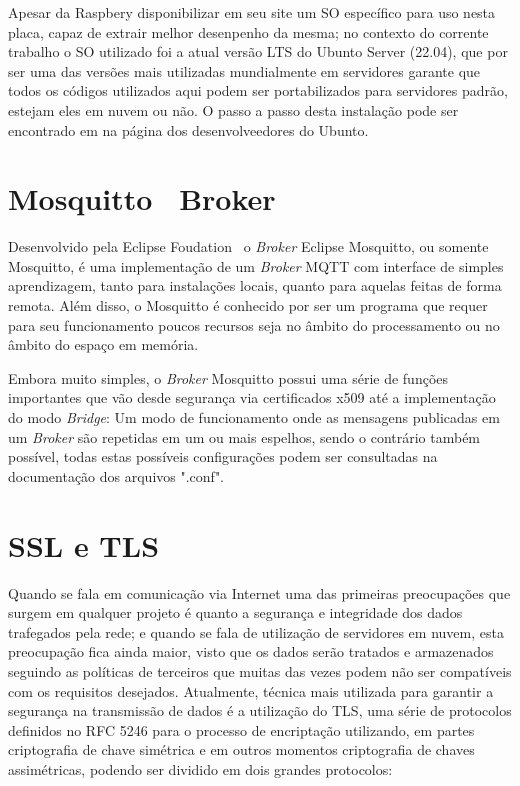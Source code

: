 Apesar da Raspbery disponibilizar em seu site um \ac{SO} específico para uso nesta placa, capaz de extrair melhor 
desenpenho da mesma; no contexto do corrente trabalho o \ac{SO} utilizado foi a atual versão \ac{LTS} do Ubunto Server (22.04),
que por ser uma das versões mais utilizadas mundialmente em servidores garante que todos os códigos utilizados aqui podem 
ser portabilizados para servidores padrão, estejam eles em nuvem ou não. O passo a passo desta instalação pode ser 
encontrado em na página dos desenvolveedores do Ubunto. \cite{ubunto-inst}

\section{Mosquitto\textregistered~ Broker}

Desenvolvido pela Eclipse Foudation\textregistered~ o \textit{Broker} Eclipse Mosquitto, ou somente Mosquitto, é uma 
implementação de um \textit{Broker} \ac{MQTT} com interface de simples aprendizagem, tanto para instalações locais,
quanto para aquelas feitas de forma remota. Além disso, o Mosquitto é conhecido por ser um programa que requer para 
seu funcionamento poucos recursos seja no âmbito do processamento ou no âmbito do espaço em memória.

Embora muito simples, o \textit{Broker} Mosquitto possui uma série de funções importantes que vão desde segurança via 
certificados x509 até a implementação do modo \textit{Bridge}: Um modo de funcionamento onde as mensagens publicadas em um 
\textit{Broker} são repetidas em um ou mais espelhos, sendo o contrário também possível, todas estas possíveis configurações
podem ser consultadas na documentação dos arquivos ".conf". \cite{mosq-doc}
 

\section{SSL e TLS}

Quando se fala em comunicação via Internet uma das primeiras preocupações que surgem em qualquer projeto é quanto a segurança
 e integridade dos dados trafegados pela rede; e quando se fala de utilização de servidores em nuvem, esta preocupação fica 
 ainda maior, visto que os dados serão tratados e armazenados seguindo as políticas de terceiros que muitas das vezes podem 
 não ser compatíveis com os requisitos desejados. Atualmente, técnica mais utilizada para garantir a segurança na transmissão
 de dados é a utilização do \ac{TLS}, uma série de protocolos definidos no RFC 5246 \cite{tls-sec} para o processo de encriptação utilizando, em partes criptografia
 de chave simétrica e em outros momentos criptografia de chaves assimétricas, podendo ser dividido em dois grandes protocolos: 

